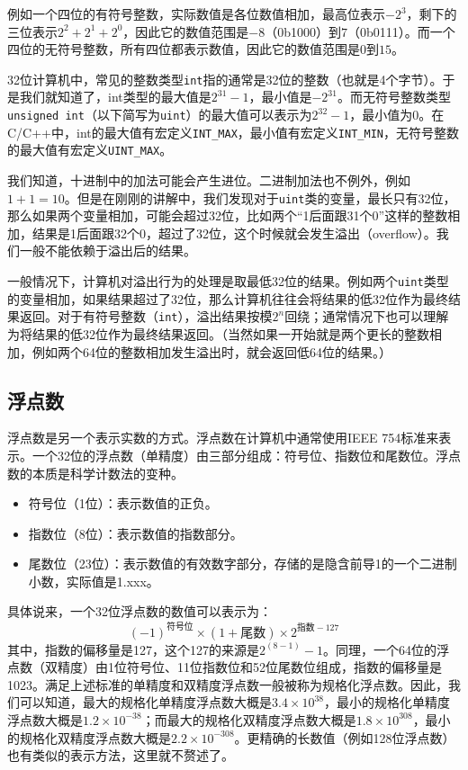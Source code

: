 例如一个四位的有符号整数，实际数值是各位数值相加，最高位表示$-2^3$，剩下的三位表示$2^2 + 2^1 + 2^0$，因此它的数值范围是$-8$（0b1000）到$7$（0b0111）。而一个四位的无符号整数，所有四位都表示数值，因此它的数值范围是$0$到$15$。

32位计算机中，常见的整数类型\texttt{int}指的通常是32位的整数（也就是4个字节）。于是我们就知道了，int类型的最大值是$2^{31}-1$，最小值是$-2^{31}$。而无符号整数类型\texttt{unsigned int}（以下简写为\texttt{uint}）的最大值可以表示为$2^{32}-1$，最小值为0。在C/C++中，int的最大值有宏定义\texttt{INT\_MAX}，最小值有宏定义\texttt{INT\_MIN}，无符号整数的最大值有宏定义\texttt{UINT\_MAX}。

我们知道，十进制中的加法可能会产生进位。二进制加法也不例外，例如$1+1=10$。但是在刚刚的讲解中，我们发现对于\texttt{uint}类的变量，最长只有32位，那么如果两个变量相加，可能会超过32位，比如两个“1后面跟31个0”这样的整数相加，结果是1后面跟32个0，超过了32位，这个时候就会发生溢出（overflow）。我们一般不能依赖于溢出后的结果。

一般情况下，计算机对溢出行为的处理是取最低32位的结果。例如两个\texttt{uint}类型的变量相加，如果结果超过了32位，那么计算机往往会将结果的低32位作为最终结果返回。对于有符号整数（\texttt{int}），溢出结果按模$2^n$回绕；通常情况下也可以理解为将结果的低32位作为最终结果返回。（当然如果一开始就是两个更长的整数相加，例如两个64位的整数相加发生溢出时，就会返回低64位的结果。）

\subsection{浮点数}

浮点数是另一个表示实数的方式。浮点数在计算机中通常使用IEEE 754标准来表示。一个32位的浮点数（单精度）由三部分组成：符号位、指数位和尾数位。浮点数的本质是科学计数法的变种。
\begin{itemize}
  \item 符号位（1位）：表示数值的正负。
  \item 指数位（8位）：表示数值的指数部分。
  \item 尾数位（23位）：表示数值的有效数字部分，存储的是隐含前导1的一个二进制小数，实际值是1.xxx。
\end{itemize}

具体说来，一个32位浮点数的数值可以表示为：
$$(-1)^{\text{符号位}} \times (1 + \text{尾数}) \times 2^{\text{指数} - 127}$$
其中，指数的偏移量是127，这个127的来源是$2^{(8-1)} - 1$。同理，一个64位的浮点数（双精度）由1位符号位、11位指数位和52位尾数位组成，指数的偏移量是1023。满足上述标准的单精度和双精度浮点数一般被称为规格化浮点数。因此，我们可以知道，最大的规格化单精度浮点数大概是$3.4 \times 10^{38}$，最小的规格化单精度浮点数大概是$1.2 \times 10^{-38}$；而最大的规格化双精度浮点数大概是$1.8 \times 10^{308}$，最小的规格化双精度浮点数大概是$2.2 \times 10^{-308}$。更精确的长数值（例如128位浮点数）也有类似的表示方法，这里就不赘述了。


